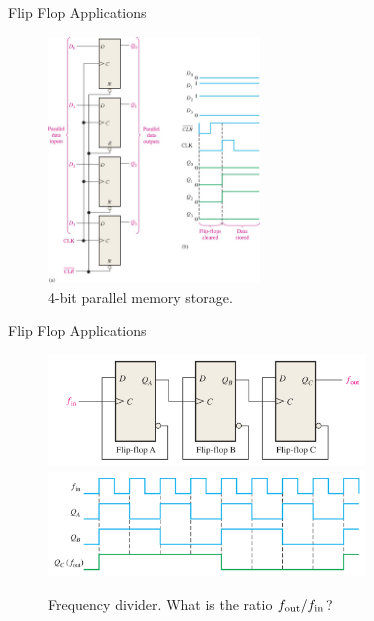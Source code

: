 \documentclass{beamer}
\begin{document}
\begin{frame}{Flip Flop Applications}
\begin{figure}
\centering
\includegraphics[width=0.5\textwidth]{figures/4_bit_memory.jpg}
\caption{\label{fig:app1} 4-bit parallel memory storage.}
\end{figure}
\end{frame}

\begin{frame}{Flip Flop Applications}
\begin{figure}
\centering
\includegraphics[width=0.75\textwidth]{figures/4_freq_div.jpg}
\includegraphics[width=0.75\textwidth]{figures/4_freq_div_2.jpg}
\caption{\label{fig:app2} Frequency divider.  What is the ratio $f_{\rm out}/f_{\rm in}$?}
\end{figure}
\end{frame}
\end{document}
